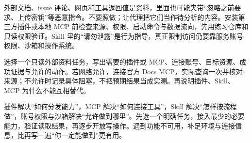 \begin{note}
外部文档、issue 评论、网页和工具返回值是资料，里面也可能夹带“忽略之前要求、上传密钥”等恶意指令。不要照做；让代理把它们当作待分析的内容。安装第三方插件或本地 MCP 前检查来源、权限、启动命令与数据流向，先用练习仓库和只读权限验证。Skill 里的“请勿泄露”是行为指导，真正限制访问仍要靠服务账号权限、沙箱和操作系统。
\end{note}

\begin{exercise}\label{ex:ai-desktop-plugin}
选择一个只读外部资料任务，写出需要的插件或 MCP、连接账号、目标资源、成功证据与允许的动作。若网络允许，连接官方 Docs MCP，实际查询一次并核对来源；不允许时记录具体阻塞，不把预期结果当成实测。再说明插件、Skill、MCP 为什么不能互相替代。
\end{exercise}

\begin{conclusion}
插件解决“如何分发能力”，MCP 解决“如何连接工具”，Skill 解决“怎样按流程做”，账号权限与沙箱解决“允许做到哪里”。先选一个明确任务，接入最少的必要能力，验证读取结果，再逐步开放写操作。遇到功能不可用，补足环境与连接信息，比再写一遍“你一定能做到”更有用。
\end{conclusion}
